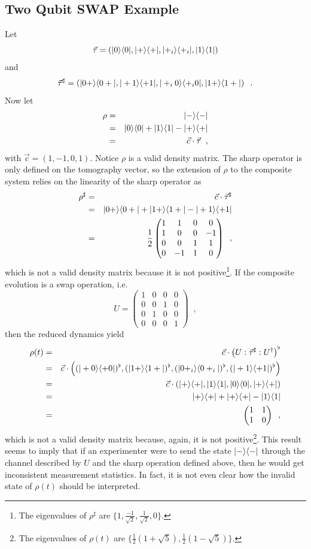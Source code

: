 \subsection{Two Qubit SWAP Example}
Let
$$
\vec{\tau}=\left(|0\rangle\langle0|,|+\rangle\langle+|,|+_i\rangle\langle+_i|,|1\rangle\langle1|\right)
$$
and
$$
\vec{\tau}^\sharp = \left(|0+\rangle\langle0+|,|+1\rangle\langle+1|,|+_i0\rangle\langle+_i0|,|1+\rangle\langle1+|\right)\;\;.
$$
Now let
\begin{eqnarray*}
\rho &=& |-\rangle\langle-| \\
&=& |0\rangle\langle0|+|1\rangle\langle1|-|+\rangle\langle+|\\
&=& \vec{c}\cdot\vec{\tau}\;\;,
\end{eqnarray*}
with $\vec{c}=(1,-1,0,1)$.  Notice $\rho$ is a valid density matrix.  The sharp operator is only defined on the tomography vector, so the extension of $\rho$ to the composite system relies on the linearity of the sharp operator as
\begin{eqnarray*}
\rho^\sharp &=& \vec{c}\cdot\vec{\tau}^\sharp\\
&=& |0+\rangle\langle0+| + |1+\rangle\langle1+| - |+1\rangle\langle+1|\\
&=& \frac{1}{2}\begin{pmatrix}
1&1&0&0\\
1&0&0&-1\\
0&0&1&1\\
0&-1&1&0
\end{pmatrix}\;\;,
\end{eqnarray*}
which is not a valid density matrix because it is not positive\footnote{The eigenvalues of $\rho^\sharp$ are $\{1,\frac{-1}{\sqrt{2}},\frac{1}{\sqrt{2}},0\}$.}.  If the composite evolution is a swap operation, i.e.\
$$
U = \begin{pmatrix}
1&0&0&0\\
0&0&1&0\\
0&1&0&0\\
0&0&0&1
\end{pmatrix}\;\;,
$$
then the reduced dynamics yield
\begin{eqnarray*}
\rho(t) &=& \vec{c}\cdot\left(U:\vec{\tau}^\sharp:U^\dagger\right)^\flat\\
&=& \vec{c}\cdot\left((|+0\rangle\langle+0|)^\flat,(|1+\rangle\langle1+|)^\flat,(|0+_i\rangle\langle0+_i|)^\flat,(|+1\rangle\langle+1|)^\flat\right)\\
&=& \vec{c}\cdot\left(|+\rangle\langle+|,|1\rangle\langle1|,|0\rangle\langle0|,|+\rangle\langle+|\right)\\
&=& |+\rangle\langle+| + |+\rangle\langle+| -|1\rangle\langle1|\\
&=& \begin{pmatrix}
1&1\\
1&0
\end{pmatrix}\;\;,
\end{eqnarray*}
which is not a valid density matrix because, again, it is not positive\footnote{The eigenvalues of $\rho(t)$ are $\{\frac{1}{2}\left(1+\sqrt{5}\right),\frac{1}{2}\left(1-\sqrt{5}\right)\}$.}.  This result seems to imply that if an experimenter were to send the state $|-\rangle\langle-|$ through the channel described by $U$ and the sharp operation defined above, then he would get inconsistent measurement statistics.  In fact, it is not even clear how the invalid state of $\rho(t)$ should be interpreted.

